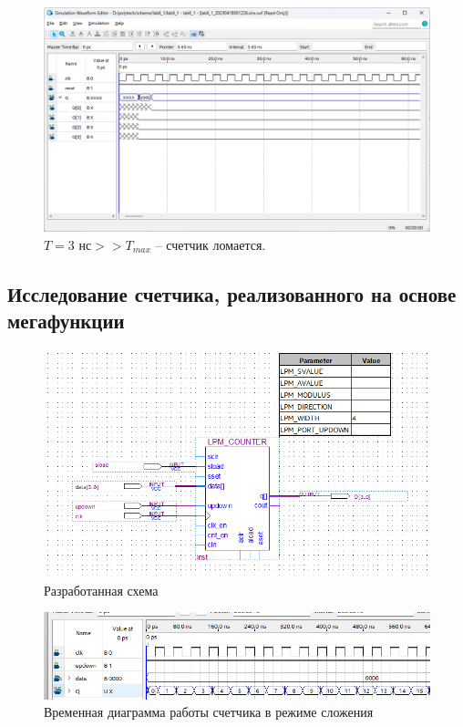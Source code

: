 \documentclass[a4paper,12pt]{article}
\begin{document}
    \begin{figure}[H]
        \centering
        \includegraphics[width=\linewidth]{wave_1__3}
        \caption{$T = 3 \text{ нс} >> T_\textit{max}$ -- счетчик ломается.}
    \end{figure}
    \subsection{Исследование счетчика, реализованного на основе мегафункции}
    \begin{figure}[H]
        \centering
        \includegraphics[width=0.9\linewidth]{scheme2}
        \caption{Разработанная схема}
    \end{figure}

    \begin{figure}[H]
        \centering
        \includegraphics[width=\linewidth]{wave_2_1}
        \caption{Временная диаграмма работы счетчика в режиме сложения}
    \end{figure}
\end{document}
